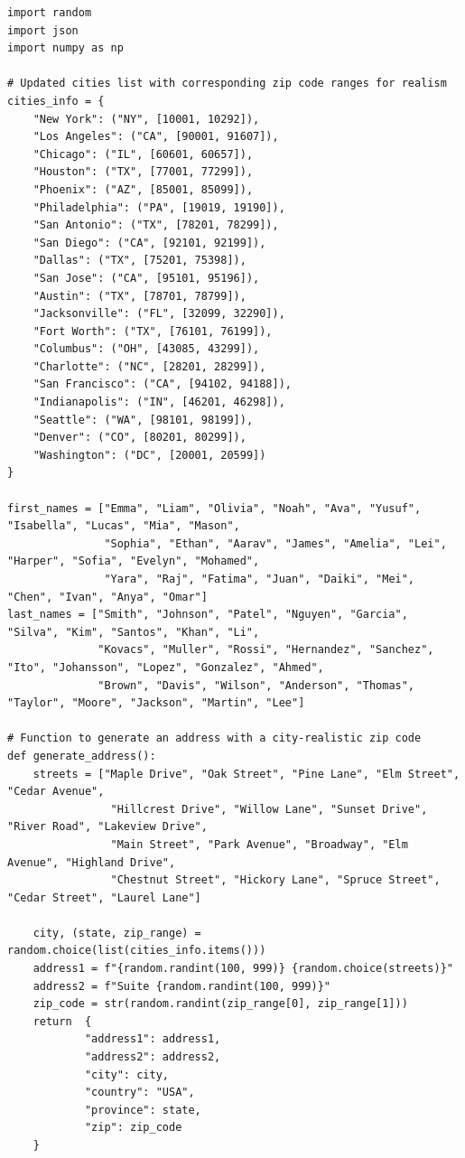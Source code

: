 \begin{verbatim}
import random
import json
import numpy as np

# Updated cities list with corresponding zip code ranges for realism
cities_info = {
    "New York": ("NY", [10001, 10292]),
    "Los Angeles": ("CA", [90001, 91607]),
    "Chicago": ("IL", [60601, 60657]),
    "Houston": ("TX", [77001, 77299]),
    "Phoenix": ("AZ", [85001, 85099]),
    "Philadelphia": ("PA", [19019, 19190]),
    "San Antonio": ("TX", [78201, 78299]),
    "San Diego": ("CA", [92101, 92199]),
    "Dallas": ("TX", [75201, 75398]),
    "San Jose": ("CA", [95101, 95196]),
    "Austin": ("TX", [78701, 78799]),
    "Jacksonville": ("FL", [32099, 32290]),
    "Fort Worth": ("TX", [76101, 76199]),
    "Columbus": ("OH", [43085, 43299]),
    "Charlotte": ("NC", [28201, 28299]),
    "San Francisco": ("CA", [94102, 94188]),
    "Indianapolis": ("IN", [46201, 46298]),
    "Seattle": ("WA", [98101, 98199]),
    "Denver": ("CO", [80201, 80299]),
    "Washington": ("DC", [20001, 20599])
}

first_names = ["Emma", "Liam", "Olivia", "Noah", "Ava", "Yusuf", "Isabella", "Lucas", "Mia", "Mason",
               "Sophia", "Ethan", "Aarav", "James", "Amelia", "Lei", "Harper", "Sofia", "Evelyn", "Mohamed",
               "Yara", "Raj", "Fatima", "Juan", "Daiki", "Mei", "Chen", "Ivan", "Anya", "Omar"]
last_names = ["Smith", "Johnson", "Patel", "Nguyen", "Garcia", "Silva", "Kim", "Santos", "Khan", "Li",
              "Kovacs", "Muller", "Rossi", "Hernandez", "Sanchez", "Ito", "Johansson", "Lopez", "Gonzalez", "Ahmed",
              "Brown", "Davis", "Wilson", "Anderson", "Thomas", "Taylor", "Moore", "Jackson", "Martin", "Lee"]

# Function to generate an address with a city-realistic zip code
def generate_address():
    streets = ["Maple Drive", "Oak Street", "Pine Lane", "Elm Street", "Cedar Avenue",
                "Hillcrest Drive", "Willow Lane", "Sunset Drive", "River Road", "Lakeview Drive",
                "Main Street", "Park Avenue", "Broadway", "Elm Avenue", "Highland Drive",
                "Chestnut Street", "Hickory Lane", "Spruce Street", "Cedar Street", "Laurel Lane"]
    
    city, (state, zip_range) = random.choice(list(cities_info.items()))
    address1 = f"{random.randint(100, 999)} {random.choice(streets)}"
    address2 = f"Suite {random.randint(100, 999)}"
    zip_code = str(random.randint(zip_range[0], zip_range[1]))
    return  {
            "address1": address1,
            "address2": address2,
            "city": city,
            "country": "USA",
            "province": state,
            "zip": zip_code
    }


\end{verbatim}
